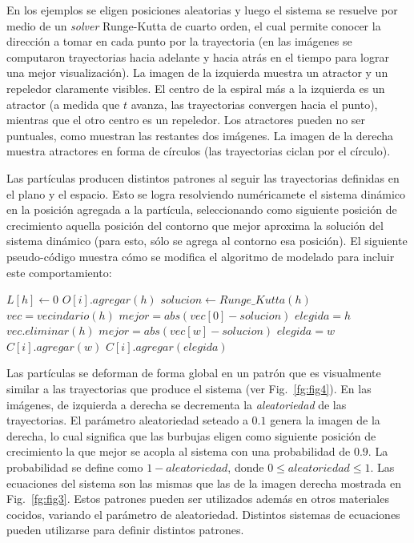 \documentclass[oneside,a4paper,spanish,links]{amca}
\begin{document}
En los ejemplos se eligen posiciones aleatorias y luego el sistema se resuelve por medio de un {\em solver} Runge-Kutta de cuarto orden, el cual permite conocer la direcci\'on a tomar en cada punto por la trayectoria (en las im\'agenes se computaron trayectorias hacia adelante y hacia atrás en el tiempo para lograr una mejor visualizaci\'on). La imagen de la izquierda muestra un atractor y un repeledor claramente visibles. El centro de la espiral m\'as a la izquierda es un atractor (a medida que $t$ avanza, las trayectorias convergen hacia el punto), mientras que el otro centro es un repeledor. Los atractores pueden no ser puntuales, como muestran las restantes dos im\'agenes. La imagen de la derecha muestra atractores en forma de c\'irculos (las trayectorias ciclan por el c\'irculo).

Las part\'iculas producen distintos patrones al seguir las trayectorias definidas en el plano y el espacio. Esto se logra resolviendo num\'ericamete el sistema din\'amico en la posici\'on agregada a la part\'icula, seleccionando como siguiente posici\'on de crecimiento aquella posici\'on del contorno que mejor aproxima la soluci\'on del sistema din\'amico (para esto, sólo se agrega al contorno esa posición). El siguiente pseudo-código muestra cómo se modifica el algoritmo de modelado para incluir este comportamiento:

\begin{algorithmic}
\State $L[h]\gets 0$ 
\State $O[i].agregar(h)$
\State $solucion \gets Runge\_Kutta(h)$
\State $vec = vecindario(h)$
\State $mejor = abs(vec[0] - solucion)$
\State $elegida = h$
\State $vec.eliminar(h)$
        \State $mejor = abs(vec[w]-solucion)$
        \State $elegida = w$
    \EndIf
        \State $C[i].agregar(w)$
    \EndIf
\EndFor
\State $C[i].agregar(elegida)$
\end{algorithmic}

Las part\'iculas se deforman de forma global en un patr\'on que es visualmente similar a las trayectorias que produce el sistema (ver Fig.~\ref{fg:fig4}). En las im\'agenes, de izquierda a derecha se decrementa la {\em aleatoriedad} de las trayectorias. El par\'ametro aleatoriedad seteado a $0.1$ genera la imagen de la derecha, lo cual significa que las burbujas eligen como siguiente posición de crecimiento la que mejor se acopla al sistema con una probabilidad de $0.9$. La probabilidad se define como $1-aleatoriedad$, donde $0 \leq aleatoriedad \leq 1$. Las ecuaciones del sistema son las mismas que las de la imagen derecha mostrada en Fig.~\ref{fg:fig3}. Estos patrones pueden ser utilizados adem\'as en otros materiales cocidos, variando el par\'ametro de aleatoriedad. Distintos sistemas de ecuaciones pueden utilizarse para definir distintos patrones.
\end{document}
